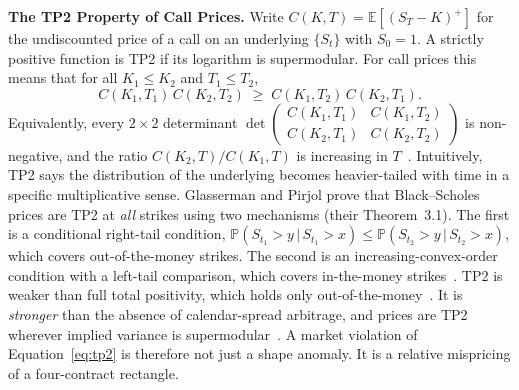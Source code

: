 \documentclass[sigconf,review]{acmart}
\begin{document}
\medskip\noindent\textbf{The TP2 Property of Call Prices.}
\label{sec:tp2theory}
Write $C(K,T)=\mathbb{E}[(S_T-K)^+]$ for the undiscounted price of a call on an underlying $\{S_t\}$ with $S_0=1$. A strictly positive function is TP2 if its logarithm is supermodular. For call prices this means that for all $K_1\le K_2$ and $T_1\le T_2$,
\begin{equation}
C(K_1,T_1)\,C(K_2,T_2)\;\ge\;C(K_1,T_2)\,C(K_2,T_1).
\label{eq:tp2}
\end{equation}
Equivalently, every $2\times2$ determinant $\det\left(\begin{smallmatrix} C(K_1,T_1) & C(K_1,T_2)\\ C(K_2,T_1) & C(K_2,T_2)\end{smallmatrix}\right)$ is non-negative, and the ratio $C(K_2,T)/C(K_1,T)$ is increasing in $T$~\cite{glasserman2026tp2theory}. Intuitively, TP2 says the distribution of the underlying becomes heavier-tailed with time in a specific multiplicative sense. Glasserman and Pirjol prove that Black--Scholes prices are TP2 at \emph{all} strikes using two mechanisms (their Theorem~3.1). The first is a conditional right-tail condition, $\mathbb{P}(S_{t_1}>y\,|\,S_{t_1}>x)\le\mathbb{P}(S_{t_2}>y\,|\,S_{t_2}>x)$, which covers out-of-the-money strikes. The second is an increasing-convex-order condition with a left-tail comparison, which covers in-the-money strikes~\cite{glasserman2026tp2theory}. TP2 is weaker than full total positivity, which holds only out-of-the-money~\cite{glasserman2023convexity}. It is \emph{stronger} than the absence of calendar-spread arbitrage, and prices are TP2 wherever implied variance is supermodular~\cite{glasserman2026tp2theory}. A market violation of Equation~\eqref{eq:tp2} is therefore not just a shape anomaly. It is a relative mispricing of a four-contract rectangle.
\end{document}
